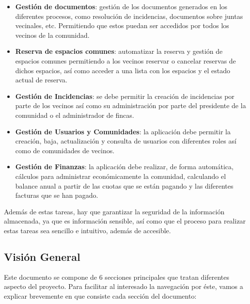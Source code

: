 \begin{itemize}
	\item \textbf{Gestión de documentos}: gestión de los documentos generados en los diferentes procesos, como resolución de incidencias, documentos sobre juntas vecinales, etc. Permitiendo que estos puedan ser accedidos por todos los vecinos de la comunidad.
	
	\item \textbf{Reserva de espacios comunes}: automatizar la reserva y gestión de espacios comunes permitiendo a los vecinos reservar o cancelar reservas de dichos espacios, así como acceder a una lista con los espacios y el estado actual de reserva.
	
	\item \textbf{Gestión de Incidencias}: se debe permitir la creación de incidencias por parte de los vecinos así como su administración por parte del presidente de la comunidad o el administrador de fincas.
	
	\item \textbf{Gestión de Usuarios y Comunidades}: la aplicación debe permitir la creación, baja, actualización y consulta de usuarios con diferentes roles así como de comunidades de vecinos.
	
	\item \textbf{Gestión de Finanzas}: la aplicación debe realizar, de forma automática, cálculos para administrar económicamente la comunidad, calculando el balance anual a partir de las cuotas que se están pagando y las diferentes facturas que se han pagado.
\end{itemize}

Además de estas tareas, hay que garantizar la seguridad de la información almacenada, ya que es información sensible, así como que el proceso para realizar estas tareas sea sencillo e intuitivo, además de accesible. 

\subsection{Visión General}
Este documento se compone de 6 secciones principales que tratan diferentes aspecto del proyecto. Para facilitar al interesado la navegación por éste, vamos a explicar brevemente en que consiste cada sección del documento:

